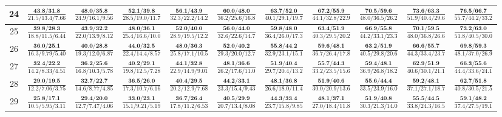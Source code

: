 \documentclass{slides}
\begin{document}
{{{\begin{tabular}{|c|c|c|c|c|c|c|c|c|c|c|}
\hline
24 & $\frac{\textbf{43.8/31.8}}{21.5/13.4/7.66}$ & $\frac{\textbf{48.0/35.8}}{24.9/16.1/9.56}$ & $\frac{\textbf{52.1/39.8}}{28.5/19.0/11.7}$ & $\frac{\textbf{56.1/43.9}}{32.3/22.2/14.2}$ & $\frac{\textbf{60.0/48.0}}{36.2/25.6/16.8}$ & $\frac{\textbf{63.7/52.0}}{40.1/29.1/19.7}$ & $\frac{\textbf{67.2/55.9}}{44.1/32.8/22.9}$ & $\frac{\textbf{70.5/59.6}}{48.0/36.5/26.2}$ & $\frac{\textbf{73.6/63.3}}{51.9/40.4/29.6}$ & $\frac{\textbf{76.5/66.7}}{55.7/44.2/33.2}$ \\
\hline
25 & $\frac{\textbf{39.8/28.3}}{18.8/11.5/6.44}$ & $\frac{\textbf{43.9/32.2}}{22.0/13.9/8.12}$ & $\frac{\textbf{48.0/36.1}}{25.4/16.6/10.0}$ & $\frac{\textbf{52.0/40.0}}{28.9/19.5/12.2}$ & $\frac{\textbf{56.0/44.0}}{32.6/22.6/14.7}$ & $\frac{\textbf{59.8/48.0}}{36.4/26.0/17.3}$ & $\frac{\textbf{63.4/51.9}}{40.3/29.5/20.2}$ & $\frac{\textbf{66.9/55.8}}{44.2/33.1/23.3}$ & $\frac{\textbf{70.1/59.5}}{48.0/36.8/26.6}$ & $\frac{\textbf{73.2/63.0}}{51.8/40.5/30.0}$ \\
\hline
26 & $\frac{\textbf{36.0/25.1}}{16.3/9.79/5.40}$ & $\frac{\textbf{40.0/28.8}}{19.3/12.0/6.87}$ & $\frac{\textbf{44.0/32.5}}{22.4/14.4/8.57}$ & $\frac{\textbf{48.0/36.3}}{25.8/17.1/10.5}$ & $\frac{\textbf{52.0/40.2}}{29.3/20.0/12.7}$ & $\frac{\textbf{55.8/44.2}}{32.9/23.1/15.1}$ & $\frac{\textbf{59.6/48.1}}{36.7/26.4/17.8}$ & $\frac{\textbf{63.2/51.9}}{40.5/29.8/20.6}$ & $\frac{\textbf{66.6/55.7}}{44.3/33.4/23.7}$ & $\frac{\textbf{69.8/59.3}}{48.1/37.0/26.9}$ \\
\hline
27 & $\frac{\textbf{32.4/22.2}}{14.2/8.33/4.51}$ & $\frac{\textbf{36.2/25.6}}{16.8/10.3/5.78}$ & $\frac{\textbf{40.2/29.1}}{19.8/12.5/7.28}$ & $\frac{\textbf{44.1/32.8}}{22.9/14.9/9.01}$ & $\frac{\textbf{48.1/36.6}}{26.2/17.6/11.0}$ & $\frac{\textbf{51.9/40.4}}{29.7/20.4/13.2}$ & $\frac{\textbf{55.7/44.3}}{33.2/23.5/15.6}$ & $\frac{\textbf{59.4/48.1}}{36.9/26.8/18.2}$ & $\frac{\textbf{62.9/51.9}}{40.6/30.1/21.1}$ & $\frac{\textbf{66.3/55.6}}{44.4/33.6/24.1}$ \\
\hline
28 & $\frac{\textbf{29.0/19.5}}{12.2/7.06/3.75}$ & $\frac{\textbf{32.7/22.7}}{14.6/8.77/4.85}$ & $\frac{\textbf{36.5/26.0}}{17.3/10.7/6.16}$ & $\frac{\textbf{40.4/29.5}}{20.2/12.9/7.68}$ & $\frac{\textbf{44.2/33.1}}{23.3/15.4/9.43}$ & $\frac{\textbf{48.1/36.8}}{26.6/18.0/11.4}$ & $\frac{\textbf{51.9/40.6}}{30.0/20.9/13.6}$ & $\frac{\textbf{55.6/44.4}}{33.5/23.9/16.0}$ & $\frac{\textbf{59.2/48.1}}{37.1/27.1/18.7}$ & $\frac{\textbf{62.7/51.8}}{40.8/30.5/21.5}$ \\
\hline
29 & $\frac{\textbf{25.8/17.1}}{10.5/5.95/3.11}$ & $\frac{\textbf{29.4/20.0}}{12.7/7.47/4.06}$ & $\frac{\textbf{33.0/23.1}}{15.1/9.21/5.19}$ & $\frac{\textbf{36.7/26.4}}{17.8/11.2/6.53}$ & $\frac{\textbf{40.5/29.9}}{20.7/13.4/8.08}$ & $\frac{\textbf{44.3/33.4}}{23.7/15.8/9.85}$ & $\frac{\textbf{48.1/37.1}}{27.0/18.4/11.8}$ & $\frac{\textbf{51.9/40.8}}{30.3/21.3/14.0}$ & $\frac{\textbf{55.5/44.5}}{33.8/24.3/16.5}$ & $\frac{\textbf{59.1/48.2}}{37.4/27.5/19.1}$ \\

\end{tabular}}}}
\end{document}
